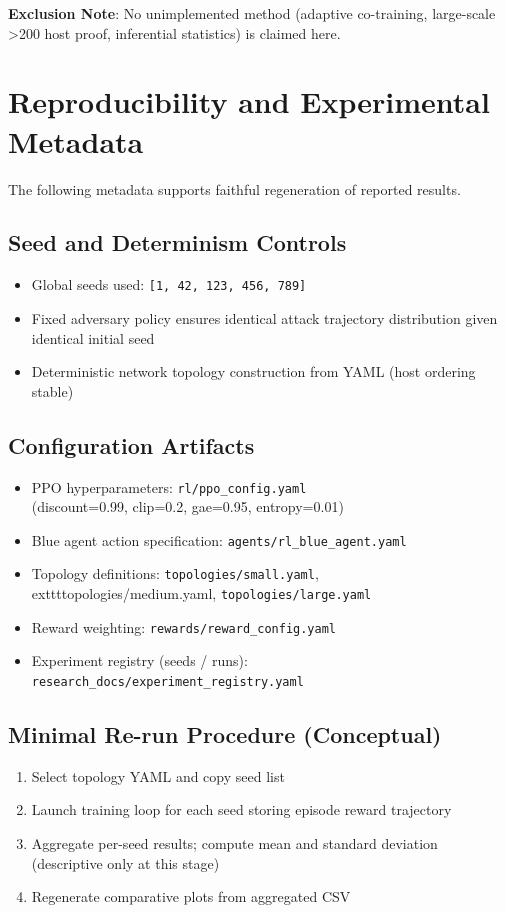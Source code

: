 \documentclass[12pt]{article}
\theoremstyle{definition}
\theoremstyle{plain}
\begin{document}
	\textbf{Exclusion Note}: No unimplemented method (adaptive co-training, large-scale >200 host proof, inferential statistics) is claimed here.

\section{Reproducibility and Experimental Metadata}

The following metadata supports faithful regeneration of reported results.

\subsection{Seed and Determinism Controls}
\begin{itemize}
    \item Global seeds used: \texttt{[1, 42, 123, 456, 789]}
    \item Fixed adversary policy ensures identical attack trajectory distribution given identical initial seed
    \item Deterministic network topology construction from YAML (host ordering stable)
\end{itemize}

\subsection{Configuration Artifacts}
\begin{itemize}
    \item PPO hyperparameters: \texttt{rl/ppo\_config.yaml} \\
          (discount=0.99, clip=0.2, gae=0.95, entropy=0.01)
    \item Blue agent action specification: \texttt{agents/rl\_blue\_agent.yaml}
    \item Topology definitions: \texttt{topologies/small.yaml}, \\
          	exttt{topologies/medium.yaml}, \texttt{topologies/large.yaml}
    \item Reward weighting: \texttt{rewards/reward\_config.yaml}
    \item Experiment registry (seeds / runs): \texttt{research\_docs/experiment\_registry.yaml}
\end{itemize}

\subsection{Minimal Re-run Procedure (Conceptual)}
\begin{enumerate}
    \item Select topology YAML and copy seed list
    \item Launch training loop for each seed storing episode reward trajectory
    \item Aggregate per-seed results; compute mean and standard deviation (descriptive only at this stage)
    \item Regenerate comparative plots from aggregated CSV
\end{enumerate}
\end{document}
